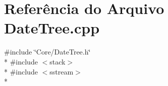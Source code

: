 \section{Referência do Arquivo Date\+Tree.\+cpp}
\label{_date_tree_8cpp}
{\ttfamily \#include \char`\"{}Core/\+Date\+Tree.\+h\char`\"{}}\\*
{\ttfamily \#include $<$stack$>$}\\*
{\ttfamily \#include $<$sstream$>$}\\*
